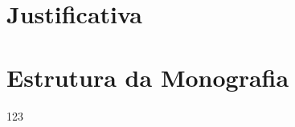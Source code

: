 \section{Justificativa}
\begin{comment}
Estamos vivendo em um mundo com muitas informações disponíveis e de fácil acesso, porém esta cada vez mais difícil filtrar e escolher as informações que vão fornecer mais insumo para o internauta.
\end{comment}


\section{Estrutura da Monografia}

123
